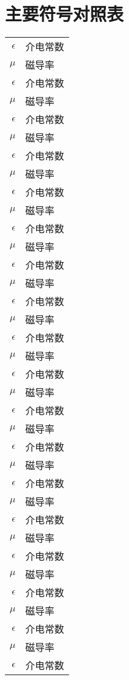\chapter{主要符号对照表}
\label{chap:symb}

\begin{longtable}{rl}
$\epsilon$     & 介电常数 \\
 $\mu$ 		& 磁导率 \\
 $\epsilon$     & 介电常数 \\
 $\mu$ 		& 磁导率 \\
 $\epsilon$     & 介电常数 \\
 $\mu$ 		& 磁导率 \\
 $\epsilon$ 	& 介电常数 \\
 $\mu$ 		& 磁导率 \\
 $\epsilon$     & 介电常数 \\
 $\mu$ 		& 磁导率 \\
 $\epsilon$     & 介电常数 \\
 $\mu$ 		& 磁导率 \\
 $\epsilon$     & 介电常数 \\
 $\mu$ 		& 磁导率 \\
 $\epsilon$ 	& 介电常数 \\
 $\mu$ 		& 磁导率 \\
 $\epsilon$     & 介电常数 \\
 $\mu$ 		& 磁导率 \\
 $\epsilon$     & 介电常数 \\
 $\mu$ 		& 磁导率 \\
 $\epsilon$     & 介电常数 \\
 $\mu$ 		& 磁导率 \\
 $\epsilon$ 	& 介电常数 \\
 $\mu$ 		& 磁导率 \\
 $\epsilon$     & 介电常数 \\
 $\mu$ 		& 磁导率 \\
 $\epsilon$     & 介电常数 \\
 $\mu$ 		& 磁导率 \\
 $\epsilon$     & 介电常数 \\
 $\mu$ 		& 磁导率 \\
 $\epsilon$ 	& 介电常数 \\
 $\mu$ 		& 磁导率 \\
 $\epsilon$     & 介电常数 \\
 $\mu$ 		& 磁导率 \\
 $\epsilon$     & 介电常数 \\

\end{longtable}

